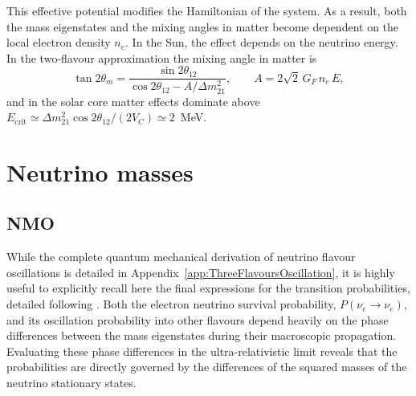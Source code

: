 This effective potential modifies the Hamiltonian of the system. As a result, both the mass eigenstates and the mixing angles in matter become dependent on the local electron density $n_e$. In the Sun, the effect depends on the neutrino energy. In the two-flavour approximation the mixing angle in matter is
\begin{equation}
    \label{eq:matter-angle}
    \tan 2\theta_m = \frac{\sin 2\theta_{12}}{\cos 2\theta_{12} - A/\Delta m^2_{21}},
    \qquad A = 2\sqrt{2}\, G_F\, n_e\, E,
\end{equation}
and in the solar core matter effects dominate above $E_\text{crit} \simeq \Delta m^2_{21}\cos 2\theta_{12}/(2V_C) \simeq 2$~MeV.


\section{Neutrino masses}
\subsection{\ac{NMO}}
\label{subsec:NMO}
While the complete quantum mechanical derivation of neutrino flavour oscillations is detailed in Appendix~\ref{app:ThreeFlavoursOscillation}, it is highly useful to explicitly recall here the final expressions for the transition probabilities, detailed following \cite{Thomson}. Both the electron neutrino survival probability, $P(\nu_e \to \nu_e)$, and its oscillation probability into other flavours depend heavily on the phase differences between the mass eigenstates during their macroscopic propagation. Evaluating these phase differences in the ultra-relativistic limit reveals that the probabilities are directly governed by the differences of the squared masses of the neutrino stationary states. 

